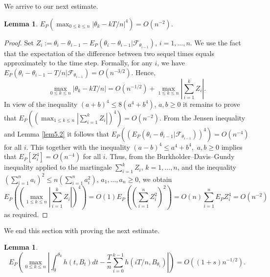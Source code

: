 \documentclass{amsart}
\newtheorem{lem}[thm]{Lemma}
\numberwithin{equation}{section}
\begin{document}
We arrive to our next estimate.
\begin{lem}\label{lem5.3}
$E_P\left(\max_{0\leq k\leq n}|\theta_k- kT/n|^4\right)= O(n^{-2}).$
\end{lem}
\begin{proof}
Set $Z_i:=\theta_{i}-\theta_{i-1}-E_P(\theta_{i}-\theta_{i-1}|\mathcal F_{\theta_{i-1}})$, $i=1,...,n$.
We use the fact that the expectation of the difference between two sequel times equals approximately to the time step.
Formally, for any $i$, we have $E_P(\theta_{i}-\theta_{i-1}-T/n|\mathcal F_{\theta_{i-1}})=O(n^{-3/2})$. Hence,
\[\max_{0\leq k\leq n}|\theta_k- kT/n|= O(n^{-1/2})+\max_{1\leq k\leq n}|\sum_{i=1}^{k}Z_i|.\]
In view of the inequality $(a+b)^4\leq 8(a^4+b^4)$, $a,b\geq 0$ it remains to prove that
$E_P \left(\left(\max_{1\leq k\leq n}|\sum_{i=1}^{k}Z_i|\right)^4\right)=O(n^{-2})$.
From the Jensen inequality and Lemma \ref{lem5.2} it follows that
$E_P\left((E_P(\theta_{i}-\theta_{i-1}|\mathcal F_{\theta_{i-1}}))^4\right)=O(n^{-4})$ for all $i$.
This together with the inequality $(a-b)^4\leq a^4+b^4,$ $a,b\geq 0$ implies that
$E_P[Z^4_i]=O(n^{-4})$ for all $i$.
Thus, from the Burkholder--Davis--Gundy inequality
applied to the martingale $\sum_{i=1}^k Z_i$, $k=1,...,n$, and the inequality
$\left(\sum_{i=1}^n a_i\right)^2\leq n\left(\sum_{i=1}^n a^2_i\right)$, $a_1,...,a_n\geq 0$,
we obtain
\[E_P \left(\left(\max_{1\leq k\leq n}|\sum_{i=1}^{k}Z_i|\right)^4\right)=O(1)E_P\left(\left(\sum_{i=1}^n Z^2_i\right)^2\right)=O(n)\sum_{i=1}^n E_P Z^4_i=O(n^{-2})\]
as required.
\end{proof}
We end this section with proving the next estimate.
\begin{lem}\label{stoppingtimes}
\[E_P\left(\max_{0\leq k\leq n}\left|\int_{0}^{\theta_k} h(t,B_t) dt-\frac{T}{n}\sum_{i=0}^{k-1}  h(i T/n, B_{\theta_i})\right|\right)= O((1+s) n^{-1/2}).\]
\end{lem}
\end{document}
